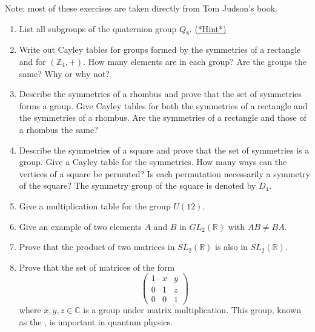 {\small
Note: most of these exercises are taken directly from Tom Judson's book.


\begin{enumerate}

\item \label{ex:groups:quat}
List all subgroups of the quaternion group $Q_8$. \hyperref[sec:groups:hints]{(*Hint*)}
 
\item   %
Write out Cayley tables for groups formed by the symmetries of a
rectangle and for $({\mathbb Z}_4, +)$. How many elements are in each
group? Are the groups the same? Why or why not? 
 
 
\item %
Describe the symmetries of a rhombus and prove that the set of
symmetries forms a group. Give Cayley tables for both the symmetries
of a rectangle and the symmetries of a rhombus. Are the symmetries of
a rectangle and those of a rhombus the same?
 
 
\item %
Describe the symmetries of a square and prove that the set of
symmetries is a group. Give a Cayley table for the symmetries. How
many ways can the vertices of a square be permuted?  Is each
permutation necessarily a symmetry of the square?  The symmetry group
of the square is denoted by $D_4$.
 
 
\item
Give a multiplication table for the group $U(12)$.
 
\item
Give an example of two elements $A$ and $B$ in $GL_2({\mathbb R})$ with
$AB \neq BA$.
 
 
\item
Prove that the product of two matrices in $SL_2({\mathbb R})$ is also in  $SL_2({\mathbb R})$.
 
 
\item
Prove that the set of matrices of the form
\[
\begin{pmatrix}
1 & x & y \\
0 & 1 & z \\
0 & 0 & 1
\end{pmatrix}
\]
where $x,y,z \in \mathbb{C}$ is a group under matrix multiplication.  This group, known as the
, is important in
quantum physics.  
 

\end{enumerate}}
